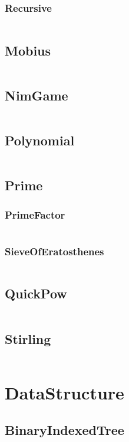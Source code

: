 \documentclass[a4paper,11pt]{article}
\begin{document}
\subsubsection{Recursive}
\inputminted[breaklines]{c++}{02++Math/+InverseElement/+Recursive.cpp}

\subsection{Mobius}
\inputminted[breaklines]{c++}{02++Math/+Mobius.cpp}
\subsection{NimGame}
\inputminted[breaklines]{c++}{02++Math/+NimGame.cpp}
\subsection{Polynomial}
\inputminted[breaklines]{c++}{02++Math/+Polynomial.cpp}
\subsection{Prime}
\subsubsection{PrimeFactor}
\inputminted[breaklines]{c++}{02++Math/+Prime/+PrimeFactor.cpp}
\subsubsection{SieveOfEratosthenes}
\inputminted[breaklines]{c++}{02++Math/+Prime/+SieveOfEratosthenes.cpp}

\subsection{QuickPow}
\inputminted[breaklines]{c++}{02++Math/+QuickPow.cpp}
\subsection{Stirling}
\inputminted[breaklines]{c++}{02++Math/+Stirling.cpp}

\newpage
\section{DataStructure}
\subsection{BinaryIndexedTree}
\inputminted[breaklines]{c++}{03++DataStructure/+BinaryIndexedTree.cpp}
\end{document}
